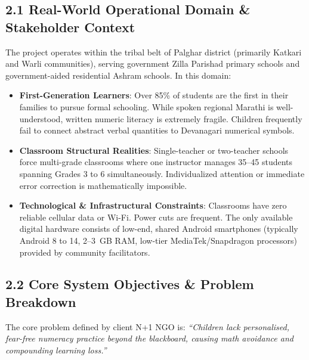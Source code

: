 \documentclass[10pt,a4paper]{article}
\begin{document}
\subsection*{2.1 Real-World Operational Domain \& Stakeholder Context}
The project operates within the tribal belt of Palghar district (primarily Katkari and Warli communities), serving government Zilla Parishad primary schools and government-aided residential Ashram schools. In this domain:
\begin{itemize}[itemsep=1.5pt]
    \item \textbf{First-Generation Learners}: Over 85\% of students are the first in their families to pursue formal schooling. While spoken regional Marathi is well-understood, written numeric literacy is extremely fragile. Children frequently fail to connect abstract verbal quantities to Devanagari numerical symbols.
    \item \textbf{Classroom Structural Realities}: Single-teacher or two-teacher schools force multi-grade classrooms where one instructor manages 35--45 students spanning Grades 3 to 6 simultaneously. Individualized attention or immediate error correction is mathematically impossible.
    \item \textbf{Technological \& Infrastructural Constraints}: Classrooms have zero reliable cellular data or Wi-Fi. Power cuts are frequent. The only available digital hardware consists of low-end, shared Android smartphones (typically Android 8 to 14, 2--3~GB RAM, low-tier MediaTek/Snapdragon processors) provided by community facilitators.
\end{itemize}

\subsection*{2.2 Core System Objectives \& Problem Breakdown}
The core problem defined by client N+1 NGO is: \textit{``Children lack personalised, fear-free numeracy practice beyond the blackboard, causing math avoidance and compounding learning loss.''}
\end{document}
